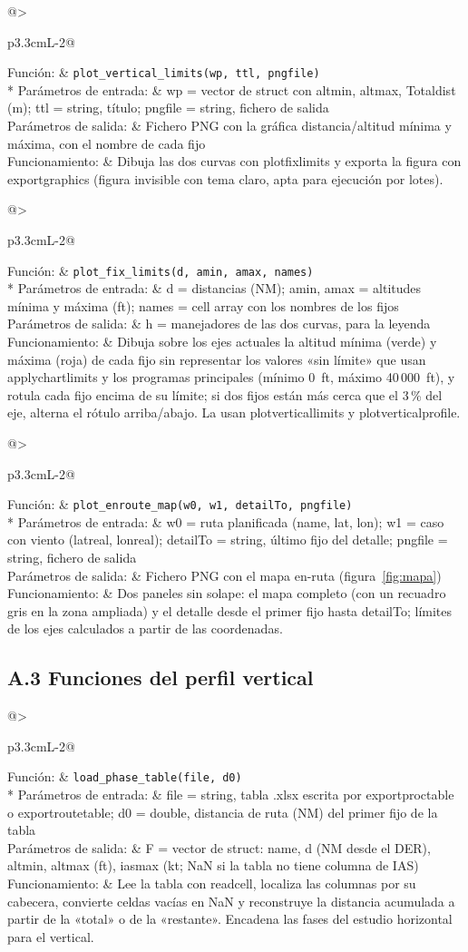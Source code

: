 \documentclass[11pt,a4paper]{article}
\makeatletter
\newcommand{\funcion}[4]{\par\Needspace{8\baselineskip}\begingroup\setlength{\LTleft}{0pt}\setlength{\LTright}{0pt}%
\setlength{\LTpre}{2mm}\setlength{\LTpost}{3mm}%
\begin{longtable}{@{}>{\bfseries\raggedright\arraybackslash}p{3.3cm}L{\dimexpr\linewidth-3.3cm-2\tabcolsep\relax}@{}}\toprule
Función: & \texttt{#1}\\* \midrule
Parámetros de entrada: & #2\\ \midrule
Parámetros de salida: & #3\\ \midrule
Funcionamiento: & #4\\ \bottomrule
\end{longtable}\addtocounter{table}{-1}\endgroup}
\DeclareRobustCommand{\m}[1]{{\ttfamily\def\_{\textunderscore\penalty100\relax}#1}}
\makeatother
\begin{document}
\funcion{plot\_vertical\_limits(wp, ttl, pngfile)}
{\m{wp} = vector de struct con \m{alt\_min}, \m{alt\_max}, \m{Total\_dist} (m); \m{ttl} = string, título; \m{pngfile} = string, fichero de salida}
{Fichero PNG con la gráfica distancia/altitud mínima y máxima, con el nombre de cada fijo}
{Dibuja las dos curvas con \m{plot\_fix\_limits} y exporta la figura con \m{exportgraphics} (figura invisible con tema claro, apta para ejecución por lotes).}

\funcion{plot\_fix\_limits(d, amin, amax, names)}
{\m{d} = distancias (NM); \m{amin}, \m{amax} = altitudes mínima y máxima (ft); \m{names} = cell array con los nombres de los fijos}
{\m{h} = manejadores de las dos curvas, para la leyenda}
{Dibuja sobre los ejes actuales la altitud mínima (verde) y máxima (roja) de cada fijo sin representar los valores «sin límite» que usan \m{apply\_chart\_limits} y los programas principales (mínimo 0~ft, máximo 40\,000~ft), y rotula cada fijo encima de su límite; si dos fijos están más cerca que el 3\,\% del eje, alterna el rótulo arriba/abajo. La usan \m{plot\_vertical\_limits} y \m{plot\_vertical\_profile}.}

\funcion{plot\_enroute\_map(w0, w1, detailTo, pngfile)}
{\m{w0} = ruta planificada (name, lat, lon); \m{w1} = caso con viento (\m{lat\_real}, \m{lon\_real}); \m{detailTo} = string, último fijo del detalle; \m{pngfile} = string, fichero de salida}
{Fichero PNG con el mapa en-ruta (figura~\ref{fig:mapa})}
{Dos paneles sin solape: el mapa completo (con un recuadro gris en la zona ampliada) y el detalle desde el primer fijo hasta \m{detailTo}; límites de los ejes calculados a partir de las coordenadas.}

\subsection*{A.3 Funciones del perfil vertical}

\funcion{load\_phase\_table(file, d0)}
{\m{file} = string, tabla .xlsx escrita por \m{export\_proc\_table} o \m{export\_route\_table}; \m{d0} = double, distancia de ruta (NM) del primer fijo de la tabla}
{\m{F} = vector de struct: name, \m{d} (NM desde el DER), \m{alt\_min}, \m{alt\_max} (ft), \m{ias\_max} (kt; NaN si la tabla no tiene columna de IAS)}
{Lee la tabla con \m{readcell}, localiza las columnas por su cabecera, convierte celdas vacías en NaN y reconstruye la distancia acumulada a partir de la «total» o de la «restante». Encadena las fases del estudio horizontal para el vertical.}
\end{document}
